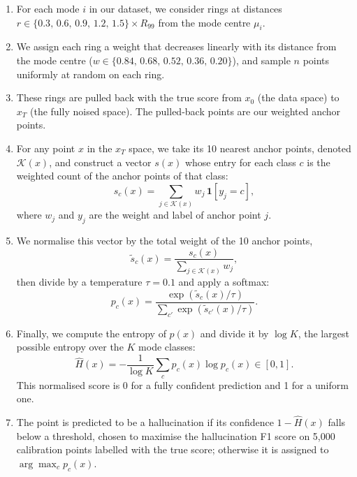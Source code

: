 \begin{enumerate}
    \item For each mode $i$ in our dataset, we consider rings at distances
    $r \in \{0.3,\, 0.6,\, 0.9,\, 1.2,\, 1.5\} \times R_{99}$ from the mode centre $\mu_i$.

    \item We assign each ring a weight that decreases linearly with its distance from the mode
    centre ($w \in \{0.84,\, 0.68,\, 0.52,\, 0.36,\, 0.20\}$), and sample $n$ points uniformly
    at random on each ring.

    \item These rings are pulled back with the true score from $x_0$ (the data space) to $x_T$
    (the fully noised space). The pulled-back points are our weighted anchor points.

    \item For any point $x$ in the $x_T$ space, we take its 10 nearest anchor points, denoted
    $\mathcal{K}(x)$, and construct a vector $s(x)$ whose entry for each class $c$ is the
    weighted count of the anchor points of that class:
    \begin{equation}
        s_c(x) = \sum_{j \in \mathcal{K}(x)} w_j \, \mathbf{1}[y_j = c],
    \end{equation}
    where $w_j$ and $y_j$ are the weight and label of anchor point $j$.

    \item We normalise this vector by the total weight of the 10 anchor points,
    \begin{equation}
        \tilde{s}_c(x) = \frac{s_c(x)}{\sum_{j \in \mathcal{K}(x)} w_j},
    \end{equation}
    then divide by a temperature $\tau = 0.1$ and apply a softmax:
    \begin{equation}
        p_c(x) = \frac{\exp\!\left(\tilde{s}_c(x) / \tau\right)}{\sum_{c'} \exp\!\left(\tilde{s}_{c'}(x) / \tau\right)}.
    \end{equation}

    \item Finally, we compute the entropy of $p(x)$ and divide it by $\log K$, the largest
    possible entropy over the $K$ mode classes:
    \begin{equation}
        \hat{H}(x) = -\frac{1}{\log K} \sum_{c} p_c(x) \log p_c(x) \in [0, 1].
    \end{equation}
    This normalised score is 0 for a fully confident prediction and 1 for a uniform one.

    \item The point is predicted to be a hallucination if its confidence $1 - \hat{H}(x)$ falls
    below a threshold, chosen to maximise the hallucination F1 score on 5{,}000 calibration
    points labelled with the true score; otherwise it is assigned to $\arg\max_c p_c(x)$.
\end{enumerate}

